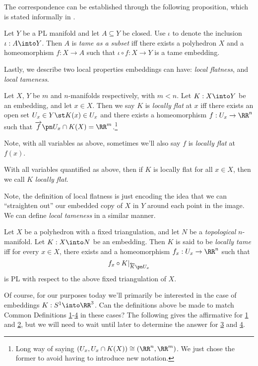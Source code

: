 The correspondence can be established through the following
proposition, which is stated informally in \cite{Daverman}.
\begin{proposition}\label{prop:tame-and-wild-subset-embedding-correspondence}
  Let $Y$ be a PL manifold and let $A \subseteq Y$ be closed. Use
  $\iota$ to denote the inclusion $\iota : A \into Y$. Then $A$ is
  \emph{tame as a subset} iff there exists a polyhedron $X$ and a
  homeomorphism $f : X \to A$ such that $\iota \circ f : X \to Y$ is a
  tame embedding.
\end{proposition}
Lastly, we describe two local properties embeddings can have:
\emph{local flatness}, and \emph{local tameness}.
\begin{definition}\label{def:locally-flat}
  Let $X$, $Y$ be $m$ and $n$-manifolds respectively, with $m < n$.
  Let $K : X \into Y$ be an embedding, and let $x \in X$. Then we say
  $K$ is \emph{locally flat} at $x$ iff there exists an open set
  $U_{x} \in Y \st K(x) \in U_x$ and there exists a homeomorphism $f :
  U_x \to \RR^n$ such that $\fim{f}{U_x \cap K(X)} =
  \RR^m$.\footnote{Long way of saying $(U_x, U_x \cap K(X)) \cong
    (\RR^n, \RR^m)$. We just chose the former to avoid having to
    introduce new notation.}
\end{definition}
Note, with all variables as above, sometimes we'll also say $f$ is
\emph{locally flat} at $f(x)$.
\begin{definition}
  With all variables quantified as above, then if $K$ is locally flat
  for all $x \in X$, then we call $K$ \emph{locally flat}.
\end{definition}
Note, the definition of local flatness is just encoding the idea that
we can ``straighten out'' our embedded copy of $X$ in $Y$ around each
point in the image. We can define \emph{local tameness} in a similar
manner.
\begin{definition}\label{def:locally-tame}
  Let $X$ be a polyhedron with a fixed triangulation, and let $N$ be a
  \emph{topological} $n$-manifold. Let $K : X \into N$ be an
  embedding. Then $K$ is said to be \emph{locally tame} iff for every
  $x \in X$, there exists  and a homeomorphism $f_x : U_x \to \RR^n$ such that
  \[
    f_x \circ K\vert_{\fpre{K}{U_x}}
  \]
  is PL with respect to the above fixed triangulation of $X$.
\end{definition}
Of course, for our purposes today we'll primarily be interested in the
case of embeddings $K : S^1 \into \RR^3$. Can the definitions above be
made to match Common Definitions
\hyperlink{def:cdef1b}{1}-\hyperlink{def:cdef:4b}{4} in these cases?
The following gives the affirmative for \hyperlink{def:cdef1b}{1} and
\hyperlink{def:cdef:4b}{2}, but we will need to wait until later to
determine the answer for \hyperlink{def:cdf3b}{3} and
\hyperlink{def:cdf3b}{4}.

